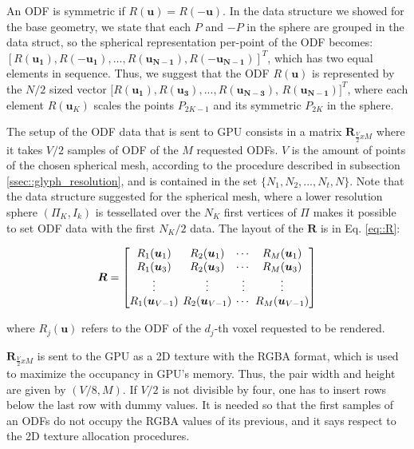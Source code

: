 \documentclass[twoside,twocolumn,10pt]{article}
\begin{document}
An ODF is symmetric if $R(\bm{u}) = R(-\bm{u})$. In the data structure we showed for the base geometry, we state that each $P$ and $-P$ in the sphere are grouped in the data struct, so the spherical representation per-point of the ODF becomes: $[R(\bm{u_1}), R(-\bm{u_1}), ..., R(\bm{u_{N-1}}), R(-\bm{u_{N-1}})]^T$, which has two equal elements in sequence. Thus, we suggest that the ODF $R(\bm{u})$ is represented by the $N/2$ sized vector $[R(\bm{u_1}), R(\bm{u_3}), ..., R(\bm{u_{N-3}})$, $R(\bm{u_{N-1}})]^T$, where each element $R(\bm{u}_{K})$ scales the points $P_{2K-1}$ and its symmetric $P_{2K}$ in the sphere.


The setup of the ODF data that is sent to GPU consists in a matrix $\bm{R}_{\frac{V}{2}xM}$ where it takes $V/2$ samples of ODF of the $M$ requested ODFs. $V$ is the amount of points of the chosen spherical mesh, according to the procedure described in subsection \ref{ssec::glyph_resolution}, and is contained in the set $\{N_1, N_2, ..., N_t, N\}$. Note that the data structure suggested for the spherical mesh, where a lower resolution sphere $(\Pi_K, I_k)$ is tessellated over the $N_K$ first vertices of $\Pi$ makes it possible to set ODF data with the first $N_K/2$ data. The layout of the $\bm{R}$ is in Eq. \ref{eq::R}:

\begin{equation}
\label{eq::R}
\bm{R} = 
\begingroup %
\setlength\arraycolsep{2pt}
\begin{bmatrix} 
    R_1(\bm{u}_1) &     R_2(\bm{u}_1)      & \cdots  &     R_M(\bm{u}_{1})  \\    
     R_1(\bm{u}_3)&     R_2(\bm{u}_3)      & \cdots  &     R_M(\bm{u}_{3}) \\
    \vdots & \vdots & \vdots & \vdots  \\    
     R_1(\bm{u}_{V-1}) & R_2(\bm{u}_{V-1}) & \cdots  & R_M(\bm{u}_{V-1})
\end{bmatrix}
\endgroup
\end{equation}

where $R_j(\bm{u})$ refers to the ODF of the $d_j$-th voxel requested to be rendered.

$\bm{R}_{\frac{V}{2}xM}$ is sent to the GPU as a 2D texture with the RGBA format, which is used to maximize the occupancy in GPU's memory. Thus, the pair width and height are given by $(V/8, M)$. If $V/2$ is not divisible by four, one has to insert rows below the last row with dummy values. It is needed so that the first samples of an ODFs do not occupy the RGBA values of its previous, and it says respect to the 2D texture allocation procedures.
\end{document}
